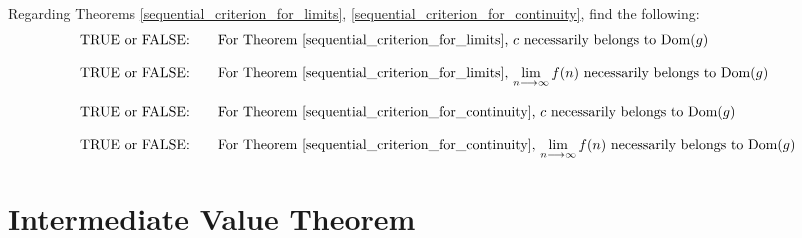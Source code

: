 \begin{exercise}
Regarding Theorems \ref{sequential_criterion_for_limits}, \ref{sequential_criterion_for_continuity}, find the following:
\begin{align*}
    &\text{TRUE or FALSE:} \hspace{20pt} \text{For Theorem \ref{sequential_criterion_for_limits}, $c$ necessarily belongs to Dom($g$)}\\[2ex]
    &\text{TRUE or FALSE:} \hspace{20pt} \text{For Theorem \ref{sequential_criterion_for_limits}, $\lim_{n \longrightarrow \infty} f(n)$ necessarily belongs to Dom($g$)}\\[2ex]
    &\text{TRUE or FALSE:} \hspace{20pt} \text{For Theorem \ref{sequential_criterion_for_continuity}, $c$ necessarily belongs to Dom($g$)}\\[2ex]
    &\text{TRUE or FALSE:} \hspace{20pt} \text{For Theorem \ref{sequential_criterion_for_continuity}, $\lim_{n \longrightarrow \infty} f(n)$ necessarily belongs to Dom($g$)}
\end{align*}
\end{exercise}

\newpage
\section{Intermediate Value Theorem}